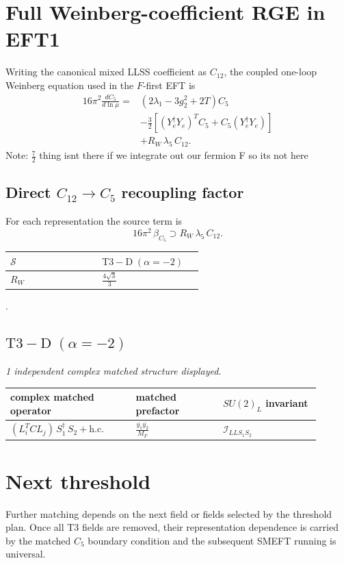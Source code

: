 \documentclass[9pt]{article}
\begin{document}
\section*{Full Weinberg-coefficient RGE in EFT1}
Writing the canonical mixed LLSS coefficient as $C_{12}$, the coupled one-loop Weinberg equation used in the $F$-first EFT is
\begin{align}
16\pi^2\frac{dC_5}{d\ln\mu}={}&(2\lambda_1-3g_2^2+2T)C_5\\
&-\frac32\left[(Y_e^\dagger Y_e)^T C_5+C_5(Y_e^\dagger Y_e)\right]\\
&+R_W\,\lambda_5\,C_{12}.
\end{align}
Note: $\frac{7}{2}$ thing isnt there if we integrate out our fermion F so its not here \subsection*{Direct $C_{12}\to C_5$ recoupling factor}
For each representation the source term is
\[16\pi^2\,\beta_{C_5}\supset R_W\,\lambda_5\,C_{12}.\]
\begin{longtable}{@{}p{0.37\linewidth}p{0.19\linewidth}@{}}
\toprule
$\mathcal{S}$ & $ \mathrm{T3-D}\;(\alpha=-2) $ \\
\midrule
$R_W$ & $ \frac{4 \sqrt{3}}{3} $ \\
\bottomrule
\end{longtable}
.
\subsection*{$ \mathrm{T3-D}\;(\alpha=-2) $}
\textit{1 independent complex matched structure displayed. }
\begin{longtable}{@{}p{0.36\linewidth}p{0.25\linewidth}p{0.29\linewidth}@{}}
\toprule
complex matched operator & matched prefactor & $SU(2)_L$ invariant \\
\midrule
$ (L_i^T C L_j)\,S_1^\dagger\,S_2+\mathrm{h.c.} $ & $ \frac{\overline{y_{1}} \overline{y_{2}}}{M_F} $ & $ \mathcal{I}_{LLS_1S_2} $ \\
\bottomrule
\end{longtable}
\section*{Next threshold}
Further matching depends on the next field or fields selected by the threshold plan.  Once all T3 fields are removed, their representation dependence is carried by the matched $C_5$ boundary condition and the subsequent SMEFT running is universal.
\end{document}
